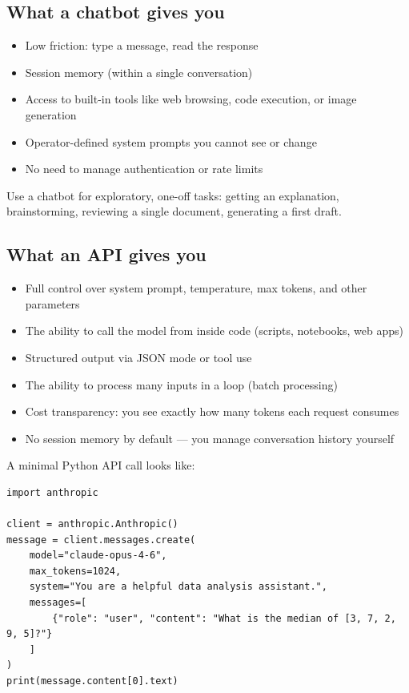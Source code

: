 \subsection{What a chatbot gives you}

\begin{itemize}[noitemsep,topsep=0pt]
  \item Low friction: type a message, read the response
  \item Session memory (within a single conversation)
  \item Access to built-in tools like web browsing, code execution, or image generation
  \item Operator-defined system prompts you cannot see or change
  \item No need to manage authentication or rate limits
\end{itemize}

Use a chatbot for exploratory, one-off tasks: getting an explanation, brainstorming, reviewing a single document, generating a first draft.

\subsection{What an API gives you}

\begin{itemize}[noitemsep,topsep=0pt]
  \item Full control over system prompt, temperature, max tokens, and other parameters
  \item The ability to call the model from inside code (scripts, notebooks, web apps)
  \item Structured output via JSON mode or tool use
  \item The ability to process many inputs in a loop (batch processing)
  \item Cost transparency: you see exactly how many tokens each request consumes
  \item No session memory by default --- you manage conversation history yourself
\end{itemize}

A minimal Python API call looks like:

\begin{verbatim}
import anthropic

client = anthropic.Anthropic()
message = client.messages.create(
    model="claude-opus-4-6",
    max_tokens=1024,
    system="You are a helpful data analysis assistant.",
    messages=[
        {"role": "user", "content": "What is the median of [3, 7, 2, 9, 5]?"}
    ]
)
print(message.content[0].text)
\end{verbatim}

